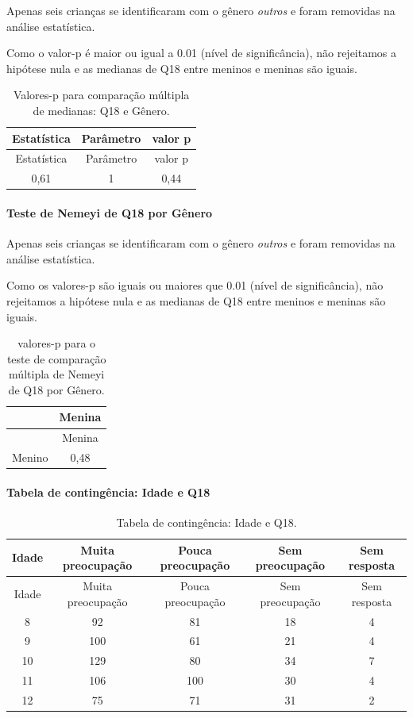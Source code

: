 \documentclass[]{article}
\let\oldparagraph\paragraph
\renewcommand{\paragraph}[1]{\oldparagraph{#1}\mbox{}}
\begin{document}
Apenas seis crianças se identificaram com o gênero \emph{outros} e foram removidas na análise estatística.

Como o valor-p é maior ou igual a 0.01 (nível de significância), não rejeitamos a hipótese nula e as medianas de Q18 entre meninos e meninas são iguais.

\begin{longtable}[]{@{}ccc@{}}
\caption{\label{tab:unnamed-chunk-265}Valores-p para comparação múltipla de medianas: Q18 e Gênero.}\tabularnewline
\toprule
Estatística & Parâmetro & valor p\tabularnewline
\midrule
\endfirsthead
\toprule
Estatística & Parâmetro & valor p\tabularnewline
\midrule
\endhead
0,61 & 1 & 0,44\tabularnewline
\bottomrule
\end{longtable}

\hypertarget{teste-de-nemeyi-de-q18-por-guxeanero}{%
\paragraph{Teste de Nemeyi de Q18 por Gênero}\label{teste-de-nemeyi-de-q18-por-guxeanero}}

Apenas seis crianças se identificaram com o gênero \emph{outros} e foram removidas na análise estatística.

Como os valores-p são iguais ou maiores que 0.01 (nível de significância), não rejeitamos a hipótese nula e as medianas de Q18 entre meninos e meninas são iguais.

\begin{longtable}[]{@{}lc@{}}
\caption{\label{tab:unnamed-chunk-267}valores-p para o teste de comparação múltipla de Nemeyi de Q18 por Gênero.}\tabularnewline
\toprule
& Menina\tabularnewline
\midrule
\endfirsthead
\toprule
& Menina\tabularnewline
\midrule
\endhead
Menino & 0,48\tabularnewline
\bottomrule
\end{longtable}

\cleardoublepage

\hypertarget{tabela-de-continguxeancia-idade-e-q18}{%
\paragraph{Tabela de contingência: Idade e Q18}\label{tabela-de-continguxeancia-idade-e-q18}}

\begin{longtable}[]{@{}ccccc@{}}
\caption{\label{tab:unnamed-chunk-268}Tabela de contingência: Idade e Q18.}\tabularnewline
\toprule
Idade & Muita preocupação & Pouca preocupação & Sem preocupação & Sem resposta\tabularnewline
\midrule
\endfirsthead
\toprule
Idade & Muita preocupação & Pouca preocupação & Sem preocupação & Sem resposta\tabularnewline
\midrule
\endhead
8 & 92 & 81 & 18 & 4\tabularnewline
9 & 100 & 61 & 21 & 4\tabularnewline
10 & 129 & 80 & 34 & 7\tabularnewline
11 & 106 & 100 & 30 & 4\tabularnewline
12 & 75 & 71 & 31 & 2\tabularnewline
\bottomrule
\end{longtable}
\end{document}
